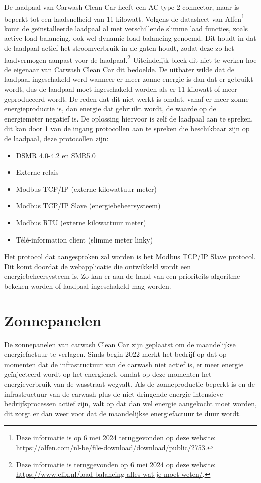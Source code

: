 De laadpaal van Carwash Clean Car heeft een AC type 2 connector, maar is beperkt tot een laadsnelheid van 11 kilowatt. Volgens de datasheet van Alfen\footnote{Deze informatie is op 6 mei 2024 teruggevonden op deze website: \url{https://alfen.com/nl-be/file-download/download/public/2753}.} komt de geïnstalleerde laadpaal al met verschillende slimme laad functies, zoals active load balancing, ook wel dynamic load balancing genoemd. Dit houdt in dat de laadpaal actief het stroomverbruik in de gaten houdt, zodat deze zo het laadvermogen aanpast voor de laadpaal.\footnote{Deze informatie is teruggevonden op 6 mei 2024 op deze website: \url{https://www.elix.nl/load-balancing-alles-wat-je-moet-weten/}.} Uiteindelijk bleek dit niet te werken hoe de eigenaar van Carwash Clean Car dit bedoelde. De uitbater wilde dat de laadpaal ingeschakeld werd wanneer er meer zonne-energie is dan dat er gebruikt wordt, dus de laadpaal moet ingeschakeld worden als er 11 kilowatt of meer geproduceerd wordt. De reden dat dit niet werkt is omdat, vanaf er meer zonne-energieproductie is, dan energie dat gebruikt wordt, de waarde op de energiemeter negatief is. De oplossing hiervoor is zelf de laadpaal aan te spreken, dit kan door 1 van de ingang protocollen aan te spreken die beschikbaar zijn op de laadpaal, deze protocollen zijn:

\begin{itemize}
    \item DSMR 4.0-4.2 en SMR5.0
    \item Externe relais
    \item Modbus TCP/IP (externe kilowattuur meter)
    \item Modbus TCP/IP Slave (energiebeheersysteem)
    \item Modbus RTU (externe kilowattuur meter)
    \item Télé-information client (slimme meter linky)
\end{itemize}

Het protocol dat aangesproken zal worden is het Modbus TCP/IP Slave protocol. Dit komt doordat de webapplicatie die ontwikkeld wordt een energiebeheersysteem is. Zo kan er aan de hand van een prioriteits algoritme bekeken worden of laadpaal ingeschakeld mag worden.

\section{Zonnepanelen}
\label{sec:stand-van-zaken-zonnepanelen}

De zonnepanelen van carwash Clean Car zijn geplaatst om de maandelijkse energiefactuur te verlagen. Sinds begin 2022 merkt het bedrijf op dat op momenten dat de infrastructuur van de carwash niet actief is, er meer energie geïnjecteerd wordt op het energienet, omdat op deze momenten het energieverbruik van de wasstraat wegvalt.  Als de zonneproductie beperkt is en de infrastructuur van de carwash plus de niet-dringende energie-intensieve bedrijfsprocessen actief zijn, valt op dat dan wel energie aangekocht moet worden, dit zorgt er dan weer voor dat de maandelijkse energiefactuur te duur wordt.\\

